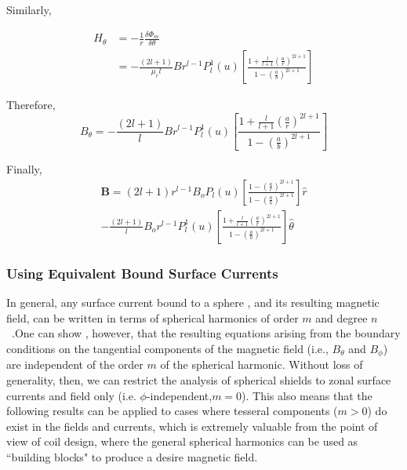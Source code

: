 Similarly,

\begin{equation}\label{Ht}
\begin{split}
 H_\theta &=-\frac{1}{r}\frac{\delta \Phi_m}{\delta \theta}\\
         & =-\frac{(2l+1)}{\mu_rl}Br^{l-1}P_l^1(u)\left[
         \frac{1+\frac{l}{l+1}\left(\frac{a}{r}\right)^{2l+1}}
         {1-\left(\frac{a}{b}\right)^{2l+1}}
         \right]
\end{split}
\end{equation}

Therefore,
\begin{equation}\label{Bt}
B_\theta=-\frac{(2l+1)}{l}Br^{l-1}P_l^1(u)\left[\frac{1+\frac{l}{l+1}\left(\frac{a}{r}\right)^{2l+1}}{1-\left(\frac{a}{b}\right)^{2l+1}}\right]
\end{equation}

Finally,
\begin{multline}\label{B}
\bm{B}=(2l+1)r^{l-1}B_o P_l(u)\left[\frac{1-\left(\frac{a}{r}\right)^{2l+1}}{1-\left(\frac{a}{b}\right)^{2l+1}}\right] \hat{r} \\ -\frac{(2l+1)}{l}B_o r^{l-1}P_l^1(u)\left[\frac{1+\frac{l}{l+1}\left(\frac{a}{r}\right)^{2l+1}}{1-\left(\frac{a}{b}\right)^{2l+1}}\right] \hat{\theta}
\end{multline}



\subsubsection{Using Equivalent Bound Surface Currents}

In general, any surface current bound to a sphere , and its resulting magnetic field, can be written in terms of spherical harmonics of order $m$ and degree $n$~\cite{CB1, smythe}.One can show , however, that the resulting equations arising from the boundary conditions on the tangential components of the magnetic field (i.e., $B_\theta$  and $B_\phi$) are independent of the order $m$ of the spherical harmonic. Without loss of generality, then, we can restrict the analysis of spherical shields to zonal surface currents and field only (i.e. $\phi$-independent,$m=0$). This also means that the following results can be applied to cases where tesseral components ($m > 0$) do exist in the fields and currents, which is extremely valuable from the point of view of coil design, where the general spherical harmonics can be used as ``building blocks" to produce a desire magnetic field.

